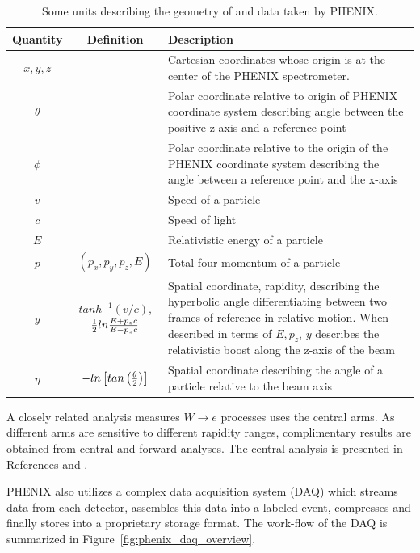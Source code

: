 \begin{table}[ht] 
  \centering
  \begin{tabular}{ c c p{8cm} }
    \toprule
    \textbf{Quantity} & \textbf{Definition} &  \textbf{Description} \\
    \midrule
    $x,y,z$ & & Cartesian coordinates whose origin is at the center of the PHENIX spectrometer. \\
    $\theta$ & & Polar coordinate relative to origin of PHENIX coordinate system describing angle between the positive z-axis and a reference point \\ 
    $\phi$ & & Polar coordinate relative to the origin of the PHENIX coordinate system describing the angle between a reference point and the x-axis \\
    $v$ & & Speed of a particle \\
    $c$ & & Speed of light \\
    $E$ & & Relativistic energy of a particle \\
    $p$ & $\left(p_x,p_y,p_z,E\right)$ & Total four-momentum of a particle \\
    $y$ & $tanh^{-1}(v/c)$, ${1\over2}{ln{{E+p_zc}\over{E-p_zc}}}$ & Spatial coordinate, rapidity, describing the hyperbolic angle differentiating between two frames of reference in relative motion. When described in terms of $E,p_z$, $y$ describes the relativistic boost along the z-axis of the beam\\ 
    $\eta$ & $-ln\left[tan\left({\theta\over2}\right)\right]$ & Spatial coordinate describing the angle of a particle relative to the beam axis \\
    \bottomrule
  \end{tabular}
  \caption{
    Some units describing the geometry of and data taken by PHENIX.
  }
  \label{tab:units}
\end{table}

A closely related analysis measures $W\rightarrow e$ processes uses the central
arms. As different arms are sensitive to different rapidity ranges,
complimentary results are obtained from central and forward analyses. The
central analysis is presented in References \cite{Gal2014b} and
\cite{Adare2015a}. 

PHENIX also utilizes a complex data acquisition system (DAQ) which streams data
from each detector, assembles this data into a labeled event, compresses and
finally stores into a proprietary storage format. The work-flow of the DAQ is
summarized in Figure~\ref{fig:phenix_daq_overview}. 

